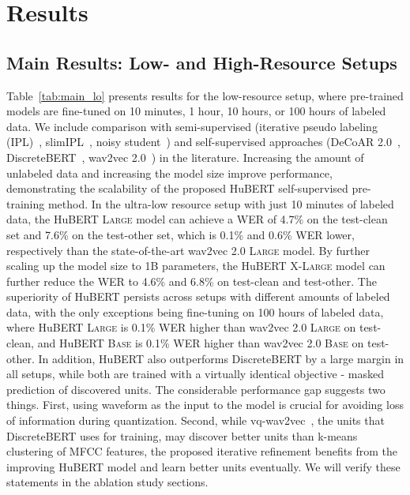 \section{Results}
\subsection{Main Results: Low- and High-Resource Setups}

Table~\ref{tab:main_lo} presents results for the low-resource setup, where pre-trained models are fine-tuned on 10 minutes, 1 hour, 10 hours, or 100 hours of labeled data. We include comparison with semi-supervised (iterative pseudo labeling (IPL)~\cite{xu2020iterative}, slimIPL~\cite{likhomanenko2020slimipl}, noisy student~\cite{park2020improved}) and self-supervised approaches (DeCoAR 2.0~\cite{ling2020decoar}, DiscreteBERT~\cite{baevski2019effectiveness}, wav2vec 2.0~\cite{baevski2020wav2vec}) in the literature.
Increasing the amount of unlabeled data and increasing the model size improve performance, demonstrating the scalability of the proposed HuBERT self-supervised pre-training method.
In the ultra-low resource setup with just 10 minutes of labeled data, the HuBERT \textsc{Large} model can achieve a WER of 4.7\% on the test-clean set and 7.6\% on the test-other set, which is 0.1\% and 0.6\% WER lower, respectively than the state-of-the-art wav2vec 2.0 \textsc{Large} model. By further scaling up the model size to 1B parameters, the HuBERT \textsc{X-Large} model can further reduce the WER to 4.6\% and 6.8\% on test-clean and test-other. The superiority of HuBERT persists across setups with different amounts of labeled data, with the only exceptions being fine-tuning on 100 hours of labeled data, where HuBERT \textsc{Large} is 0.1\% WER higher than wav2vec 2.0 \textsc{Large} on test-clean, and HuBERT \textsc{Base} is 0.1\% WER higher than wav2vec 2.0 \textsc{Base} on test-other.
In addition, HuBERT also outperforms DiscreteBERT by a large margin in all setups, while both are trained with a virtually identical objective - masked prediction of discovered units. The considerable performance gap suggests two things. First, using waveform as the input to the model is crucial for avoiding loss of information during quantization. Second, while vq-wav2vec~\cite{baevski2019vq}, the units that DiscreteBERT uses for training, may discover better units than k-means clustering of MFCC features, the proposed iterative refinement benefits from the improving HuBERT model and learn better units eventually. We will verify these statements in the ablation study sections.

